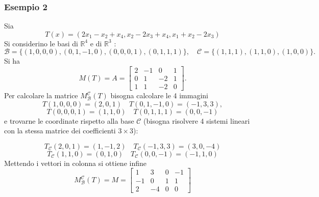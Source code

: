 \subsubsection*{Esempio 2}
Sia
$$
	T(x)=\left(2 x_1-x_2+x_4, x_2-2 x_3+x_4, x_1+x_2-2 x_3\right)
$$
Si considerino le basi di $\mathbb{R}^4$ e di $\mathbb{R}^3$ :
$$
	\mathcal{B}=\{(1,0,0,0),(0,1,-1,0),(0,0,0,1),(0,1,1,1)\}, \quad \mathcal{C}=\{(1,1,1),(1,1,0),(1,0,0)\} .
$$
Si ha
$$
	M(T)=A=\left[\begin{array}{rrrr}
			2 & -1 & 0  & 1 \\
			0 & 1  & -2 & 1 \\
			1 & 1  & -2 & 0
		\end{array}\right] .
$$
Per calcolare la matrice $M_{\mathcal{B}}^{\mathcal{C}}(T)$ bisogna calcolare le 4 immagini
\[
	T(1,0,0,0)=(2,0,1) \quad  T(0,1,-1,0)=(-1,3,3),
\]
\[
	T(0,0,0,1)=(1,1,0) \quad  T(0,1,1,1)=(0,0,-1)
\]
e trovarne le coordinate rispetto alla base $\mathcal{C}$ (bisogna risolvere 4 sistemi lineari con la stessa matrice dei coefficienti $3 \times 3$):

\[
	T_{\mathcal{C}}(2,0,1)=(1,-1,2) \quad  T_{\mathcal{C}}(-1,3,3)=(3,0,-4)
\]
\[
	T_{\mathcal{C}}(1,1,0)=(0,1,0) \quad T_{\mathcal{C}}(0,0,-1)=(-1,1,0)
\]
Mettendo i vettori in colonna si ottiene infine
\[
	M_{\mathcal{B}}^{\mathcal{C}}(T)=M=\left[\begin{array}{rrrr}
			1  & 3  & 0 & -1 \\
			-1 & 0  & 1 & 1  \\
			2  & -4 & 0 & 0
		\end{array}\right]
\]


